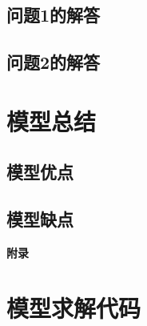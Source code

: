 \documentclass{cumcm}
\begin{document}
\subsection{问题1的解答}

\subsection{问题2的解答}


\section{模型总结}

\subsection{模型优点}

\subsection{模型缺点}





\newpage
\appendix
\textbf{附录}
\section{模型求解代码}
\end{document}
